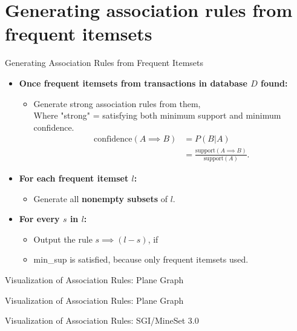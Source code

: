 \section{Generating association rules from frequent itemsets}

\begin{frame}{Generating Association Rules from Frequent Itemsets}
	\begin{itemize}
		\item \textbf{Once frequent itemsets from transactions in
			      database $D$ found:}
		      \begin{itemize}
			      \item Generate strong association rules from them,\\
			            Where "strong" = satisfying both minimum support and
			            minimum confidence.
			            \begin{align}
				            \text{confidence}(A \implies B) & =
				            P(B|A)                                                              \\
				                                            & = \frac{\text{support}(A \implies
					            B)}{\text{support}(A)}.
			            \end{align}
		      \end{itemize}
		\item \textbf{For each frequent itemset $l$:}
		      \begin{itemize}
			      \item Generate all \textbf{nonempty subsets} of $l$.
		      \end{itemize}
		\item \textbf{For every $s$ in $l$:}
		      \begin{itemize}
			      \item Output the rule $s \implies (l - s)$, if
			      \item min\_sup is satisfied, because only frequent itemsets
			            used.
		      \end{itemize}
	\end{itemize}
\end{frame}

\begin{frame}{Visualization of Association Rules: Plane Graph}
	\centering
\end{frame}

\begin{frame}{Visualization of Association Rules: Plane Graph}
	\centering
\end{frame}

\begin{frame}{Visualization of Association Rules: SGI/MineSet 3.0}
	\centering
\end{frame}

